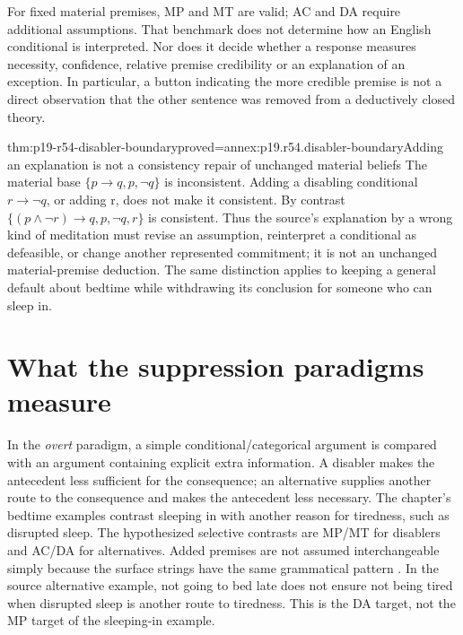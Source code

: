 For fixed material premises, MP and MT are valid; AC and DA require additional
assumptions. That benchmark does not determine how an English conditional
is interpreted. Nor does it decide whether a response measures necessity,
confidence, relative premise credibility or an explanation of an exception.
In particular, a button indicating the more credible premise is not a
direct observation that the other sentence was removed from a deductively
closed theory.

\begin{hblemma}{thm:p19-r54-disabler-boundary}{proved=annex:p19.r54.disabler-boundary}{Adding an explanation is not a consistency repair of unchanged material beliefs}
The material base \(\{p\to q,p,\neg q\}\) is inconsistent.
Adding a disabling conditional \(r\to\neg q\), or adding r,
does not make it consistent. By contrast
\(\{(p\land\neg r)\to q,p,\neg q,r\}\) is consistent.
Thus the source's explanation by a wrong kind of meditation must revise
an assumption, reinterpret a conditional as defeasible, or change another
represented commitment; it is not an unchanged material-premise deduction.
The same distinction applies to keeping a general default about bedtime
while withdrawing its conclusion for someone who can sleep in.
\end{hblemma}

\section{What the suppression paradigms measure}
\label{sec:p19-r54-paradigms}

In the \emph{overt} paradigm, a simple conditional/categorical argument
is compared with an argument containing explicit extra information. A
disabler makes the antecedent less sufficient for the consequence;
an alternative supplies another route to the consequence and makes the
antecedent less necessary. The chapter's bedtime examples contrast
sleeping in with another reason for tiredness, such as disrupted sleep.
The hypothesized selective contrasts are MP/MT for disablers and AC/DA
for alternatives. Added premises are not assumed interchangeable simply
because the surface strings have the same grammatical pattern
\cite[\S2.1]{GazzoCastanedaKnauff2021Defeasible}.
In the source alternative example, not going to bed late does not ensure
not being tired when disrupted sleep is another route to tiredness. This
is the DA target, not the MP target of the sleeping-in example.

